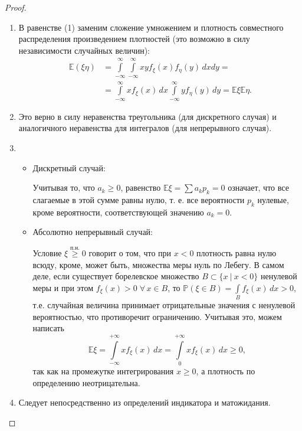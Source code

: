 \begin{proof}
\begin{enumerate}
    \item 
        В равенстве (1) заменим сложение умножением и плотность совместного распределения произведением плотностей (это возможно в силу независимости случайных величин):
        $$\begin{aligned}
            \mathbb{E}(\xi \eta) &=\int\limits_{-\infty}^{\infty} \int\limits_{-\infty}^{\infty} x y f_{\xi}(x) f_{\eta}(y) \,  dx dy = \\
            &=\int\limits_{-\infty}^{\infty} x f_{\xi}(x) \, dx \int\limits_{-\infty}^{\infty} y f_{\eta}(y) \, dy = \mathbb{E} \xi \mathbb{E} \eta.
        \end{aligned}$$
        
    \item 
        Это верно в силу неравенства треугольника (для дискретного случая) и аналогичного неравенства для интегралов (для непрерывного случая).
    
    \item 
        \begin{itemize}
            \item Дискретный случай:

                Учитывая то, что $a_k \geqslant 0$, равенство $\mathbb{E}\xi = \sum a_k p_k = 0$ означает, что все слагаемые в этой сумме равны нулю, т. е. все вероятности $p_k$ нулевые, кроме вероятности, соответствующей значению $a_k = 0$.
            \item Абсолютно непрерывный случай:
                
                Условие $\xi \overset{\text{п.н.}}{\geqslant} 0$ говорит о том, что при $x < 0$ плотность равна нулю всюду, кроме, может быть, множества меры нуль по Лебегу.
                В самом деле, если существует борелевское множество $B \subset \{x \: | \: x < 0\}$ ненулевой меры и при этом ${f_{\xi}(x) > 0 \; \forall \, x \in B}$, 
                то ${\mathbb{P}\left(\xi \in B\right) = \int\limits_{B} f_{\xi}(x) \, dx > 0}$, т.е. случайная величина принимает отрицательные значения с ненулевой вероятностью, что противоречит ограничению.
                Учитывая это, можем написать
                $$ \mathbb{E}\xi = \int\limits_{-\infty}^{+\infty} x f_{\xi}(x) \, dx = \int\limits_{0}^{+\infty} x f_{\xi}(x) \, dx \geqslant 0,$$
                так как на промежутке интегрирования $x \geqslant 0$, а плотность по определению неотрицательна.
        \end{itemize}
    \item 
        Следует непосредственно из определений индикатора и матожидания.
    

\end{enumerate}
\end{proof}
